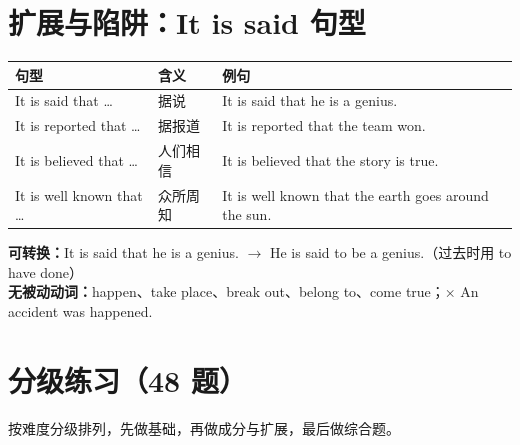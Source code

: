 \documentclass[11pt,a4paper]{ctexart}
\begin{document}
\section{扩展与陷阱：It is said 句型}
\begin{center}
\begin{tabular}{p{4.6cm}p{2.8cm}p{6.4cm}}
\hline
\textbf{句型} & \textbf{含义} & \textbf{例句}\\
\hline
It is said that \ldots & 据说 & It is said that he is a genius.\\
It is reported that \ldots & 据报道 & It is reported that the team won.\\
It is believed that \ldots & 人们相信 & It is believed that the story is true.\\
It is well known that \ldots & 众所周知 & It is well known that the earth goes around the sun.\\
\hline
\end{tabular}
\end{center}
\textbf{可转换：}It is said that he is a genius. $\rightarrow$ He is said to be a genius.（过去时用 to have done）\\
\textbf{无被动动词：}happen、take place、break out、belong to、come true；× An accident was happened.


\newpage
\section{分级练习（48 题）}
\noindent 按难度分级排列，先做基础，再做成分与扩展，最后做综合题。
\end{document}
